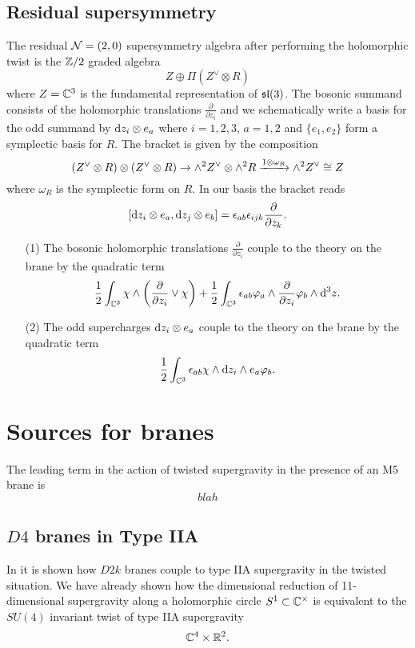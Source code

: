 \documentclass[11pt]{amsart}
\begin{document}
\subsection{Residual supersymmetry}

The residual $\mathcal N=(2,0)$ supersymmetry algebra after performing the holomorphic twist is the $\mathbb Z/2$ graded algebra 
\[
Z \oplus \Pi (Z^\vee \otimes R)
\]
where $Z = \mathbb C^3$ is the fundamental representation of $\mathfrak{sl}(3)$. 
The bosonic summand consists of the holomorphic translations $\frac{\partial}{\partial z_i}$ and we schematically write a basis for the odd summand by ${\rm d} z_i \otimes e_a$ where $i=1,2,3$, $a=1,2$ and $\{e_1,e_2\}$ form a symplectic basis for $R$.  
The bracket is given by the composition 
\[
(Z^\vee \otimes R) \otimes (Z^\vee \otimes R) \to \wedge^2 Z^\vee \otimes \wedge^2 R \xrightarrow{1 \otimes \omega_R} \wedge^2 Z^\vee \cong Z
\]
where $\omega_R$ is the symplectic form on $R$. 
In our basis the bracket reads
\[
[{\rm d} z_i \otimes e_a, {\rm d} z_j \otimes e_b] = \epsilon_{ab} \epsilon_{ijk} \frac{\partial}{\partial z_k}.
\]

\begin{itemize}
\item[(1)] The bosonic holomorphic translations $\frac{\partial}{\partial z_i}$ couple to the theory on the brane by the quadratic term
\[
\frac12 \int_{\mathbb C^3} \chi \wedge \left(\frac{\partial}{\partial z_i} \vee \chi\right) + \frac12 \int_{\mathbb C^3} \epsilon_{ab} \varphi_a \wedge \frac{\partial}{\partial z_i} \varphi_b \wedge {\rm d}^3 z .
\]
\item[(2)] The odd supercharges ${\rm d} z_i \otimes e_a$ couple to the theory on the brane by the quadratic term 
\[
\frac12 \int_{\mathbb C^3} \epsilon_{ab} \chi \wedge {\rm d} z_i \wedge e_a \varphi_b .
\]
\end{itemize}

\section{Sources for branes}

The leading term in the action of twisted supergravity in the presence of an M5 brane is
\[
blah
\]

\subsection{$D4$ branes in Type IIA}

In \cite{CLsugra} it is shown how $D2k$ branes couple to type IIA supergravity in the twisted situation. 
We have already shown how the dimensional reduction of 11-dimensional supergravity along a holomorphic circle $S^1 \subset \mathbb C^\times$ is equivalent to the $SU(4)$ invariant twist of type IIA supergravity
\[
\mathbb C^4 \times \mathbb R^2 .
\]
\end{document}
